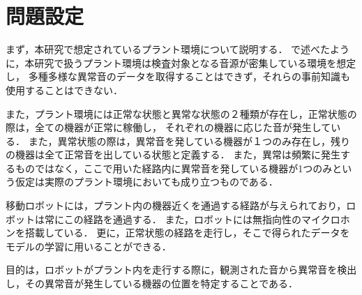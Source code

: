 \documentclass[../main]{subfiles}
\begin{document}
\section{問題設定}
\label{sec:problem_setting}
まず，本研究で想定されているプラント環境について説明する．
で述べたように，本研究で扱うプラント環境は検査対象となる音源が密集している環境を想定し，
多種多様な異常音のデータを取得することはできず，それらの事前知識も使用することはできない．

また，プラント環境には正常な状態と異常な状態の２種類が存在し，正常状態の際は，全ての機器が正常に稼働し，
それぞれの機器に応じた音が発生している．
また，異常状態の際は，異常音を発している機器が１つのみ存在し，残りの機器は全て正常音を出している状態と定義する．
また，異常は頻繁に発生するものではなく，ここで用いた経路内に異常音を発している機器が1つのみという仮定は実際のプラント環境においても成り立つものである．

移動ロボットには，プラント内の機器近くを通過する経路が与えられており，ロボットは常にこの経路を通過する．
また，ロボットには無指向性のマイクロホンを搭載している．
更に，正常状態の経路を走行し，そこで得られたデータをモデルの学習に用いることができる．

目的は，ロボットがプラント内を走行する際に，観測された音から異常音を検出し，その異常音が発生している機器の位置を特定することである．
\end{document}
